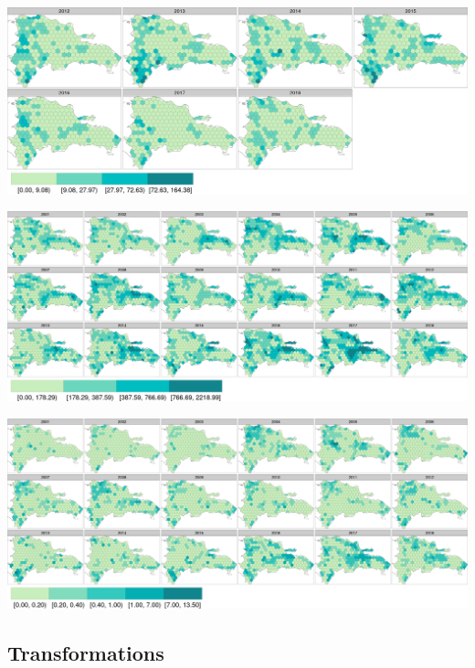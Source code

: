 \documentclass[10pt,landscape,a3paper]{article}
\begin{document}
\begin{center}\includegraphics{img/modelling/aa-yearly-forest-loss-maps-2} \end{center}

\begin{center}\includegraphics{img/modelling/aa-yearly-forest-loss-maps-3} \end{center}

\begin{center}\includegraphics{img/modelling/aa-yearly-forest-loss-maps-4} \end{center}

\hypertarget{transformations}{%
\subsection{Transformations}\label{transformations}}
\end{document}
